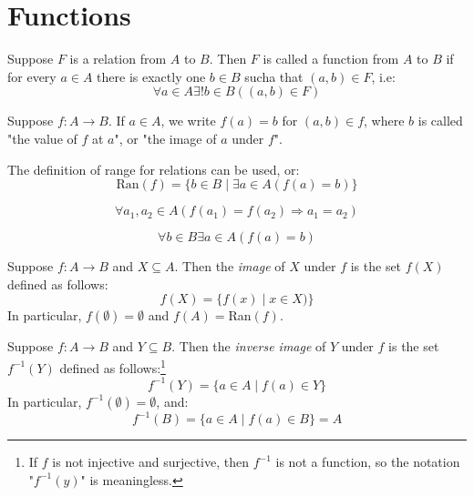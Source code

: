 \documentclass[nobib,notoc]{tufte-handout}
\begin{document}
\section{Functions}
\begin{defi}[Function]
	Suppose \(F\) is a relation from \(A\) to \(B\). Then \(F\) is called a function from \(A\) to \(B\) if for every \(a\in A\) there is exactly one \(b\in B\) sucha that \((a,b)\in F\), i.e:
	\begin{equation*}
		\forall a\in A\exists !b\in B((a,b)\in F)
	\end{equation*}
\end{defi}
\begin{notat}
	Suppose \(f:A\rightarrow B\). If \(a\in A\), we write \(f(a)=b\) for \((a,b)\in f\), where \(b\) is called "the value of \(f\) at \(a\)", or "the image of \(a\) under \(f\)".
\end{notat}
\begin{defi}
	The definition of range for relations can be used, or:
	\begin{equation*}
		\text{Ran}(f)=\{b\in B\mid \exists a\in A(f(a)=b)\}
	\end{equation*}
\end{defi}
\begin{defi}
	\begin{equation*}
		\forall a_1,a_2\in A(f(a_1)=f(a_2)\Rightarrow a_1=a_2)
	\end{equation*}
\end{defi}
\begin{defi}
	\begin{equation*}
		\forall b\in B\exists a\in A(f(a)=b)
	\end{equation*}
\end{defi}
\begin{defi}[Image]
	Suppose \(f:A\rightarrow B\) and \(X\subseteq A\). Then the \emph{image} of \(X\) under \(f\) is the set \(f(X)\) defined as follows:
	\begin{equation*}
		f(X)=\{f(x)\mid x\in X)\}
	\end{equation*}
	In particular, \(f(\emptyset)=\emptyset\) and \(f(A)=\)Ran\((f)\).
\end{defi}
\begin{defi}
	Suppose \(f:A\rightarrow B\) and \(Y\subseteq B\). Then the \emph{inverse image} of \(Y\) under \(f\) is the set \(f^{-1}(Y)\) defined as follows:\footnote{If \(f\) is not injective and surjective, then \(f^{-1}\) is not a function, so the notation "\(f^{-1}(y)\)" is meaningless.}
	\begin{equation*}
		f^{-1}(Y)=\{a\in A\mid f(a)\in Y\}
	\end{equation*}
	In particular, \(f^{-1}(\emptyset)=\emptyset\), and:
	\begin{equation*}
		f^{-1}(B)=\{a\in A\mid f(a)\in B\}=A
	\end{equation*}
\end{defi}
\end{document}
